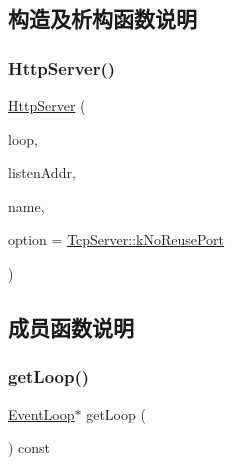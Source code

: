 \subsection{构造及析构函数说明}
\mbox{\label{classmuduo_1_1net_1_1HttpServer_a497e7b9c047a6b99d3727de450774988}} 
\subsubsection{\texorpdfstring{Http\+Server()}{HttpServer()}}
{\footnotesize\ttfamily \hyperlink{classmuduo_1_1net_1_1HttpServer}{Http\+Server} (\begin{DoxyParamCaption}\item[{\hyperlink{classmuduo_1_1net_1_1EventLoop}{Event\+Loop} $\ast$}]{loop,  }\item[{const \hyperlink{classmuduo_1_1net_1_1InetAddress}{Inet\+Address} \&}]{listen\+Addr,  }\item[{const string \&}]{name,  }\item[{\hyperlink{classmuduo_1_1net_1_1TcpServer_a0e65ad13124ea2cb5e255b640464e35f}{Tcp\+Server\+::\+Option}}]{option = {\ttfamily \hyperlink{classmuduo_1_1net_1_1TcpServer_a0e65ad13124ea2cb5e255b640464e35fa5ddf56db99b3883a1c729e8b6873bbf5}{Tcp\+Server\+::k\+No\+Reuse\+Port}} }\end{DoxyParamCaption})}



\subsection{成员函数说明}
\mbox{\label{classmuduo_1_1net_1_1HttpServer_aef1cbfe0592e8196e6c81b4db82a39ce}} 
\subsubsection{\texorpdfstring{get\+Loop()}{getLoop()}}
{\footnotesize\ttfamily \hyperlink{classmuduo_1_1net_1_1EventLoop}{Event\+Loop}$\ast$ get\+Loop (\begin{DoxyParamCaption}{ }\end{DoxyParamCaption}) const\hspace{0.3cm}{\ttfamily [inline]}}



